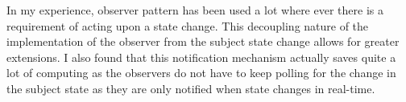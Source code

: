 \documentclass[12pt]{article}
\begin{document}
In my experience, observer pattern has been used a lot where ever there is a requirement of acting upon a state change. This decoupling nature of the implementation of the observer from the subject state change allows for greater extensions. I also found that this notification mechanism actually saves quite a lot of computing as the observers do not have to keep polling for the change in the subject state as they are only notified when state changes in real-time. 
\end{document}
